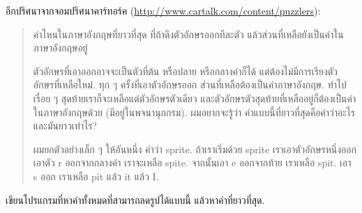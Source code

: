 \begin{exercise}


อีกปริศนาจากจอมปริศนาคาร์ทอร์ค
(\url{http://www.cartalk.com/content/puzzlers}):

\begin{quote}

คำไหนในภาษาอังกฤษที่ยาวที่สุด ที่ถ้าดึงตัวอักษรออกทีละตัว แล้วส่วนที่เหลือยังเป็นคำในภาษาอังกฤษอยู่


ตัวอักษรที่เอาออกอาจจะเป็นตัวที่ต้น หรือปลาย หรือกลางคำก็ได้
แต่ต้องไม่มีการเรียงตัวอักษรที่เหลือใหม่.
ทุก ๆ ครั้งที่เอาตัวอักษรออก ส่วนที่เหลือต้องเป็นคำภาษาอังกฤษ.
ทำไปเรื่อย ๆ สุดท้ายเราก็จะเหลือแต่ตัวอักษรตัวเดียว และตัวอักษรตัวสุดท้ายที่เหลืออยู่ก็ต้องเป็นคำในภาษาอังกฤษด้วย (มีอยู่ในพจนานุกกรม).
ผมอยากจะรู้ว่า คำแบบนี้ที่ยาวที่สุดคือคำว่าอะไร และมันยาวเท่าไร?


ผมยกตัวอย่างเล็ก ๆ ให้อันหนึ่ง คำว่า sprite.
ถ้าเราเริ่มด้วย sprite เราเอาตัวอักษรหนึ่งออก เอาตัว r ออกจากกลางคำ
เราจะเหลือ spite.
จากนั้นเอา e ออกจากท้าย เราเหลือ spit.
เอา s ออก เราเหลือ pit แล้ว it แล้ว I.
 

\end{quote}

เขียนโปรแกรมที่หาคำทั้งหมดที่สามารถลดรูปได้แบบนี้ แล้วหาคำที่ยาวที่สุด.



\end{exercise}
